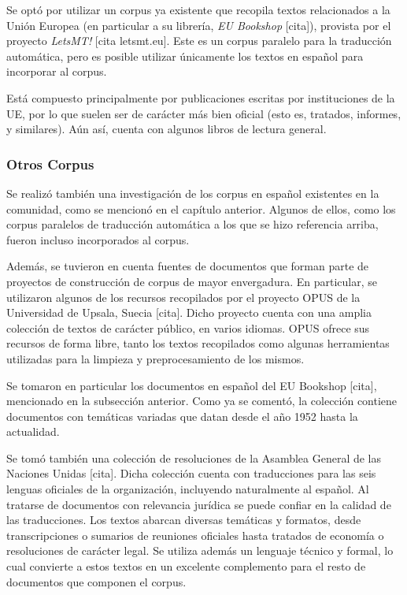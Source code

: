 Se optó por utilizar un corpus ya existente que recopila textos relacionados a la Unión Europea (en
particular a su librería, \textit{EU Bookshop} [cita]), provista por el proyecto \textit{LetsMT!}
[cita letsmt.eu]. Este es un corpus paralelo para la traducción automática, pero es posible utilizar
únicamente los textos en español para incorporar al corpus.

Está compuesto principalmente por publicaciones escritas por instituciones de la UE, por lo que
suelen ser de carácter más bien oficial (esto es, tratados, informes, y similares). Aún así, cuenta
con algunos libros de lectura general.


\subsubsection{Otros Corpus}

Se realizó también una investigación de los corpus en español existentes en la comunidad, como se mencionó
en el capítulo anterior. Algunos de ellos, como los corpus paralelos de traducción automática a los que se
hizo referencia arriba, fueron incluso incorporados al corpus.

Además, se tuvieron en cuenta fuentes de documentos que forman parte de proyectos de
construcción de corpus de mayor envergadura. En particular, se utilizaron algunos de los recursos
recopilados por el proyecto OPUS de la Universidad de Upsala, Suecia [cita]. Dicho proyecto cuenta
con una amplia colección de textos de carácter público, en varios idiomas. OPUS ofrece sus recursos
de forma libre, tanto los textos recopilados como algunas herramientas utilizadas para la limpieza y
preprocesamiento de los mismos.

Se tomaron en particular los documentos en español del EU Bookshop [cita], mencionado en la subsección
anterior. Como ya se comentó, la colección contiene documentos con temáticas variadas que datan desde
el año 1952 hasta la actualidad.

Se tomó también una colección de resoluciones de la Asamblea General de las Naciones Unidas [cita].
Dicha colección cuenta con traducciones para las seis lenguas oficiales de la organización, incluyendo
naturalmente al español. Al tratarse de documentos con relevancia jurídica se puede confiar en la
calidad de las traducciones. Los textos abarcan diversas temáticas y formatos, desde transcripciones o
sumarios de reuniones oficiales hasta tratados de economía o resoluciones de carácter legal. Se utiliza
además un lenguaje técnico y formal, lo cual convierte a estos textos en un excelente complemento para
el resto de documentos que componen el corpus.

